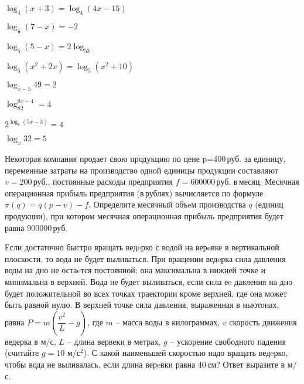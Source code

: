 \begin{class}[number=1]
\begin{listofex}
\begin{enumcols}[itemcolumns=2]
			\item \( \log_4(x+3)=\log_4(4x-15) \)
			\item \( \log_{\frac{1}{7}}(7-x)=-2 \)
			\item \( \log_5(5-x)=2\log_53 \)
			\item \( \log_5(x^2+2x)=\log_5(x^2+10) \)
			\item \( \log_{x-5}49=2 \)
			\item \( \log_82^{8x-4}=4 \)
			\item \( 2^{\log_8(5x-3)}=4 \)
			\item \( \log_x32=5 \)
		\end{enumcols}
		\item Некоторая компания продает свою продукцию по цене p=400 руб. за единицу, переменные затраты на производство одной единицы продукции составляют \( v=200 \) руб., постоянные расходы предприятия \( f= 600000 \) руб. в месяц. Месячная операционная прибыль предприятия (в рублях) вычисляется по формуле \( \pi(q)=q(p-v)-f \). Определите месячный объeм производства \( q \) (единиц продукции), при котором месячная операционная прибыль предприятия будет равна \( 900 000 \) руб.
		\item Если достаточно быстро вращать ведeрко с водой на верeвке в вертикальной плоскости, то вода не будет выливаться. При вращении ведeрка сила давления воды на дно не остаeтся постоянной: она максимальна в нижней точке и минимальна в верхней. Вода не будет выливаться, если сила еe давления на дно будет положительной во всех точках траектории кроме верхней, где она может быть равной нулю. В верхней точке сила давления, выраженная в ньютонах, равна \( P=m \left( \dfrac{v^2}{L}-g \right) \), где \( m \) -- масса воды в килограммах, \( v \) скорость движения ведерка в м/с, \( L \) -- длина вервеки в метрах, \( g \) -- ускорение свободного падения (считайте \( g=10 \) м/с\( ^2 \)). С какой наименьшей скоростью надо вращать ведeрко, чтобы вода не выливалась, если длина верeвки равна \( 40 \) см? Ответ выразите в м/с.
	\end{listofex}
\end{class}
%
%
